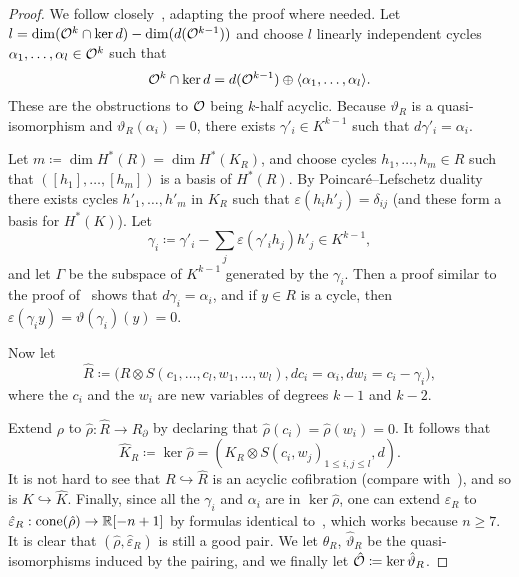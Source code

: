 \begin{proof}
  We follow closely~\cite[Sections~4 and~5]{LambrechtsStanley2008}, adapting the proof where needed.
  Let $l = \dim(\mathcal{O}^{k} \cap \ker d) - \dim(d(\mathcal{O}^{k-1}))$ and choose $l$ linearly independent cycles $\alpha_{1}, \dots, \alpha_{l} \in \mathcal{O}^{k}$ such that
  \begin{equation}
    \mathcal{O}^{k} \cap \ker d = d(\mathcal{O}^{k-1}) \oplus \langle \alpha_{1}, \dots, \alpha_{l} \rangle.
  \end{equation}
  These are the obstructions to $\mathcal{O}$ being $k$-half acyclic.
  Because $\vartheta_{R}$ is a quasi-isomorphism and $\vartheta_{R}(\alpha_{i}) = 0$, there exists $\gamma'_{i} \in K^{k-1}$ such that $d\gamma'_{i} = \alpha_{i}$.
   
  Let $m \coloneqq \dim H^{*}(R) = \dim H^{*}(K_{R})$, and choose cycles $h_{1}, \dots, h_{m} \in R$ such that $([h_{1}], \dots, [h_{m}])$ is a basis of $H^{*}(R)$.
  By Poincaré--Lefschetz duality there exists cycles $h'_{1}, \dots, h'_{m}$ in $K_{R}$ such that $\varepsilon(h_{i} h'_{j}) = \delta_{ij}$ (and these form a basis for $H^{*}(K)$).
  Let
  \begin{equation}
    \gamma_{i} \coloneqq \gamma'_{i} - \sum_{j} \varepsilon(\gamma'_{i} h_{j}) h'_{j} \in K^{k-1},
  \end{equation}
  and let $\Gamma$ be the subspace of $K^{k-1}$ generated by the $\gamma_{i}$.
  Then a proof similar to the proof of~\cite[Lemma~4.1]{LambrechtsStanley2008} shows that $d\gamma_{i} = \alpha_{i}$, and if $y \in R$ is a cycle, then $\varepsilon(\gamma_{i} y) = \vartheta(\gamma_{i})(y) = 0$.
   
  Now let
  \begin{equation}
    \hat{R} \coloneqq \bigl( R \otimes S(c_{1}, \dots, c_{l}, w_{1}, \dots, w_{l}), dc_{i} = \alpha_{i}, dw_{i} = c_{i} - \gamma_{i} \bigr),
  \end{equation}
  where the $c_{i}$ and the $w_{i}$ are new variables of degrees $k-1$ and $k-2$.
   
  Extend $\rho$ to $\hat{\rho} : \hat{R} \to R_{\partial}$ by declaring that $\hat{\rho}(c_{i}) = \hat{\rho}(w_{i}) = 0$.
  It follows that
  \begin{equation}
    \hat{K}_{R} \coloneqq \ker \hat{\rho} = (K_{R} \otimes S(c_{i}, w_{j})_{1 \leq i, j \leq l}, d).
  \end{equation}
  It is not hard to see that $R \hookrightarrow \hat{R}$ is an acyclic cofibration (compare with~\cite[Lemma~4.2]{LambrechtsStanley2008}), and so is $K \hookrightarrow \hat{K}$.
  Finally, since all the $\gamma_{i}$ and $\alpha_{i}$ are in $\ker \hat{\rho}$, one can extend $\varepsilon_{R}$ to $\hat{\varepsilon}_{R} : \operatorname{cone}(\hat{\rho}) \to \mathbb{R}[-n+1]$ by formulas identical to~\cite[Equation~4.5]{LambrechtsStanley2008}, which works because $n \geq 7$.
  It is clear that $(\hat{\rho}, \hat{\varepsilon}_{R})$ is still a good pair.
  We let $\hat{\theta}_{R}$, $\hat{\vartheta}_{R}$ be the quasi-isomorphisms induced by the pairing, and we finally let $\hat{\mathcal{O}} \coloneqq \ker \hat{\vartheta}_{R}$.
   

\end{proof}
